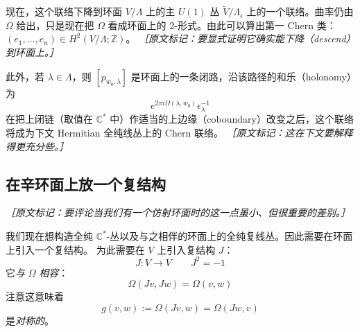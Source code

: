现在，这个联络下降到环面 $V/\Lambda$ 上的主 $U(1)$ 丛 $\tilde V/\Lambda_\epsilon$ 上的一个联络。曲率仍由
$\Omega$ 给出，只是现在把 $\Omega$ 看成环面上的 $2$-形式。由此可以算出第一 Chern 类：
$(e_1,\dots,e_n)\in H^2(V/\Lambda;\mathbb{Z})$。
{\small\itshape ［原文标记：要显式证明它确实能下降（descend）到环面上。］}

此外，若 $\lambda\in\Lambda$，则 $[p_{w_0,\lambda}]$ 是环面上的一条闭路，沿该路径的和乐（holonomy）为
\begin{equation}
  e^{2\pi i\Omega(\lambda,w_0)}\epsilon_\lambda^{-1}
  \tag{E.16}
  \label{eq:E.16}
\end{equation}
在把上闭链（取值在 $\mathbb{C}^*$ 中）作适当的上边缘（coboundary）改变之后，这个联络将成为下文
Hermitian 全纯线丛上的 Chern 联络。
{\small\itshape ［原文标记：这在下文要解释得更充分些。］}


\subsection{在辛环面上放一个复结构} %
{\small\itshape ［原文标记：要评论当我们有一个仿射环面时的这一点虽小、但很重要的差别。］}

我们现在想构造全纯 $\mathbb{C}^*$-丛以及与之相伴的环面上的全纯复线丛。因此需要在环面上引入一个复结构。
为此需要在 $V$ 上引入复结构 $J$：
\begin{equation}
  J:V\to V\qquad J^2=-1
  \tag{E.17}
  \label{eq:E.17}
\end{equation}
它\emph{与} $\Omega$ \emph{相容}：
\begin{equation}
  \Omega(Jv,Jw) = \Omega(v,w)
  \tag{E.18}
  \label{eq:E.18}
\end{equation}
注意这意味着
\begin{equation}
  g(v,w):=\Omega(Jv,w)=\Omega(Jw,v)
  \tag{E.19}
  \label{eq:E.19}
\end{equation}
是\emph{对称的}。

